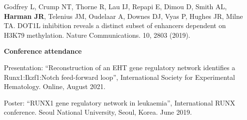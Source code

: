 \noindent
Godfrey L, Crump NT, Thorne R, Lau IJ, Repapi E, Dimou D, Smith AL, \textbf{Harman JR}, Telenius JM, Oudelaar A, Downes DJ, Vyas P, Hughes JR, Milne TA. DOT1L inhibition reveals a distinct subset of enhancers dependent on H3K79 methylation. Nature Communications. 10, 2803 (2019).

\noindent
\textbf{Conference attendance}

\noindent
Presentation: “Reconstruction of an EHT gene regulatory network identifies a Runx1:Ikzf1:Notch feed-forward loop”, International Society for Experimental Hematology. Online, August 2021.

\noindent
Poster: “RUNX1 gene regulatory network in leukaemia”, International RUNX conference. Seoul National University, Seoul, Korea. June 2019.
